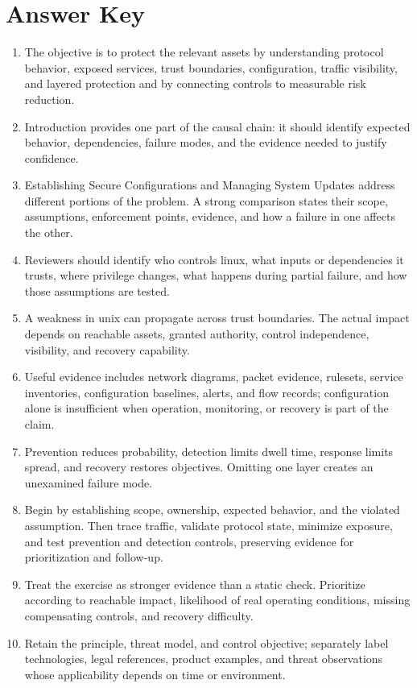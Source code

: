 \documentclass[11pt,letterpaper]{article}
\begin{document}
\section*{Answer Key}
\begin{enumerate}
\item The objective is to protect the relevant assets by understanding protocol behavior, exposed services, trust boundaries, configuration, traffic visibility, and layered protection and by connecting controls to measurable risk reduction.
\item Introduction provides one part of the causal chain: it should identify expected behavior, dependencies, failure modes, and the evidence needed to justify confidence.
\item Establishing Secure Configurations and Managing System Updates address different portions of the problem. A strong comparison states their scope, assumptions, enforcement points, evidence, and how a failure in one affects the other.
\item Reviewers should identify who controls linux, what inputs or dependencies it trusts, where privilege changes, what happens during partial failure, and how those assumptions are tested.
\item A weakness in unix can propagate across trust boundaries. The actual impact depends on reachable assets, granted authority, control independence, visibility, and recovery capability.
\item Useful evidence includes network diagrams, packet evidence, rulesets, service inventories, configuration baselines, alerts, and flow records; configuration alone is insufficient when operation, monitoring, or recovery is part of the claim.
\item Prevention reduces probability, detection limits dwell time, response limits spread, and recovery restores objectives. Omitting one layer creates an unexamined failure mode.
\item Begin by establishing scope, ownership, expected behavior, and the violated assumption. Then trace traffic, validate protocol state, minimize exposure, and test prevention and detection controls, preserving evidence for prioritization and follow-up.
\item Treat the exercise as stronger evidence than a static check. Prioritize according to reachable impact, likelihood of real operating conditions, missing compensating controls, and recovery difficulty.
\item Retain the principle, threat model, and control objective; separately label technologies, legal references, product examples, and threat observations whose applicability depends on time or environment.
\end{enumerate}
\end{document}
